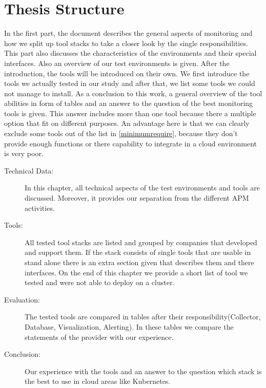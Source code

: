 \section{Thesis Structure}
In the first part, the document describes the general aspects of monitoring and how we split up tool stacks to take a closer look by the single responsibilities. This part also discusses the characteristics of the environments and their special interfaces. Also an overview of our test environments is given. After the introduction, the tools will be introduced on their own. We first introduce the tools we actually tested in our study and after that, we list some tools we could not manage to install. As a conclusion to this work, a general overview  of the tool abilities in form of tables and an answer to the question of the best monitoring tools is given. This answer includes more than one tool because there a multiple option that fit on different purposes. An advantage here is that we can clearly exclude some tools out of the list in \cref{minimumrequire}, because they don't provide enough functions or there capability to integrate in a cloud environment is very poor.
\begin{description}
\item[Technical Data:] In this chapter, all technical aspects of the test environments and tools are discussed. Moreover, it provides our separation from the different APM activities. 
\item[Tools:] All tested tool stacks are listed and grouped by companies that developed and support them. If the stack consists of single tools that are usable in stand alone there is an extra section given that describes them and there interfaces. On the end of this chapter we provide a short list of tool we tested and were not able to deploy on a cluster.
\item[Evaluation:]The tested tools are compared in tables after their responsibility(Collector, Database, Visualization, Alerting). In these tables we compare the statements of the provider with our experience.
\item[Conclusion:] Our experience with the tools and an answer to the question which stack is the best to use in cloud areas like Kubernetes.

\end{description}


